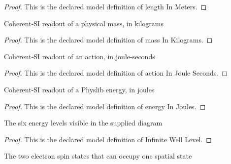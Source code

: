 \begin{proof}
  This is the declared model definition of length In Meters.
\end{proof}
\begin{definition}
  \label{def:physics:phyx-mini-0580:phyxminiproblems-problemphyxmini0580-massinkilograms}
  Coherent-SI readout of a physical mass, in kilograms
\end{definition}
\begin{proof}
  This is the declared model definition of mass In Kilograms.
\end{proof}
\begin{definition}
  \label{def:physics:phyx-mini-0580:phyxminiproblems-problemphyxmini0580-actioninjouleseconds}
  Coherent-SI readout of an action, in joule-seconds
\end{definition}
\begin{proof}
  This is the declared model definition of action In Joule Seconds.
\end{proof}
\begin{definition}
  \label{def:physics:phyx-mini-0580:phyxminiproblems-problemphyxmini0580-energyinjoules}
  Coherent-SI readout of a Physlib energy, in joules
\end{definition}
\begin{proof}
  This is the declared model definition of energy In Joules.
\end{proof}
\begin{definition}
  \label{def:physics:phyx-mini-0580:phyxminiproblems-problemphyxmini0580-infinitewelllevel}
  The six energy levels visible in the supplied diagram
\end{definition}
\begin{proof}
  This is the declared model definition of Infinite Well Level.
\end{proof}
\begin{definition}
  \label{def:physics:phyx-mini-0580:phyxminiproblems-problemphyxmini0580-electronspin}
  The two electron spin states that can occupy one spatial state
\end{definition}
